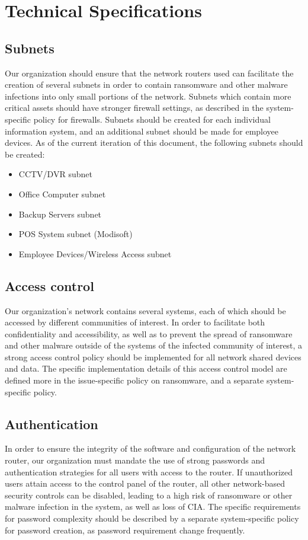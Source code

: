 \documentclass[11pt]{article}
\begin{document}
\section{Technical Specifications}
\label{sec:org7c5e931}
\subsection{Subnets}
\label{sec:orgbdcade2}
Our organization should ensure that the network routers used can facilitate the creation of several subnets in order to contain ransomware and other malware infections into only small portions of the network. Subnets which contain more critical assets should have stronger firewall settings, as described in the system-specific policy for firewalls. Subnets should be created for each individual information system, and an additional subnet should be made for employee devices. As of the current iteration of this document, the following subnets should be created:

\begin{itemize}
\item CCTV/DVR subnet
\item Office Computer subnet
\item Backup Servers subnet
\item POS System subnet (Modisoft)
\item Employee Devices/Wireless Access subnet
\end{itemize}

\subsection{Access control}
\label{sec:org481cc4c}
Our organization's network contains several systems, each of which should be accessed by different communities of interest. In order to facilitate both confidentiality and accessibility, as well as to prevent the spread of ransomware and other malware outside of the systems of the infected community of interest, a strong access control policy should be implemented for all network shared devices and data. The specific implementation details of this access control model are defined more in the issue-specific policy on ransomware, and a separate system-specific policy.

\subsection{Authentication}
\label{sec:orgf2d8d3f}
In order to ensure the integrity of the software and configuration of the network router, our organization must mandate the use of strong passwords and authentication strategies for all users with access to the router. If unauthorized users attain access to the control panel of the router, all other network-based security controls can be disabled, leading to a high risk of ransomware or other malware infection in the system, as well as loss of CIA. The specific requirements for password complexity should be described by a separate system-specific policy for password creation, as password requirement change frequently.
\end{document}

